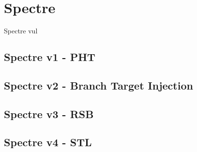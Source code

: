 \section{Spectre}
Spectre vul
\subsection{Spectre v1 - PHT}
\subsection{Spectre v2 - Branch Target Injection}
\subsection{Spectre v3 - RSB}
\subsection{Spectre v4 - STL}
